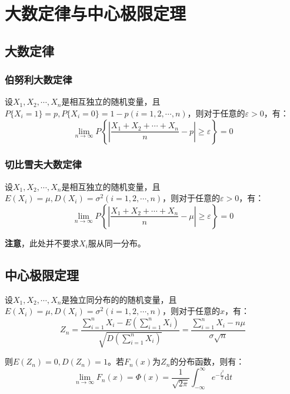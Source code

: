 \documentclass[a4paper,12pt]{ctexart}
\begin{document}
\section{大数定律与中心极限定理}

\subsection{大数定律}

\subsubsection{伯努利大数定律}

设$X_1,X_2,\cdots,X_n$是相互独立的随机变量，且$P\{X_i = 1\} = p, P\{X_i = 0\} = 1 - p(i = 1,2,\cdots,n)$，则对于任意的$\varepsilon > 0$，有：
\begin{equation*}
	\lim_{n\rightarrow\infty}P\left\{\left|\frac{X_1 + X_2 + \cdots + X_n}{n} - p\right| \geq \varepsilon\right\} = 0
\end{equation*}

\subsubsection{切比雪夫大数定律}

设$X_1,X_2,\cdots,X_n$是相互独立的随机变量，且$E(X_i) = \mu, D(X_i) = \sigma^2(i = 1,2,\cdots,n)$，则对于任意的$\varepsilon > 0$，有：
\begin{equation*}
	\lim_{n\rightarrow\infty}P\left\{\left|\frac{X_1 + X_2 + \cdots + X_n}{n} - \mu\right| \geq \varepsilon\right\} = 0
\end{equation*}

\textbf{注意}，此处并不要求$X_i$服从同一分布。

\subsection{中心极限定理}

设$X_1,X_2,\cdots,X_n$是独立同分布的的随机变量，且$E(X_i) = \mu, D(X_i) = \sigma^2(i = 1,2,\cdots,n)$，则对于任意的$x$，有：
\begin{equation*}
	Z_n = \frac{\sum_{i=1}^nX_i - E\left(\sum_{i=1}^nX_i\right)}{\sqrt{D\left(\sum_{i=1}^nX_i\right)}} = \frac{\sum_{i=1}^nX_i - n\mu}{\sigma\sqrt{n}}
\end{equation*}

则$E(Z_n) = 0, D(Z_n) = 1$。若$F_n(x)$为$Z_n$的分布函数，则有：
\begin{equation*}
	\lim_{n\rightarrow\infty}F_n(x) = \Phi(x) = \frac{1}{\sqrt{2\pi}}\int_{-\infty}^{\infty}e^{-\frac{t^2}{2}}\mathrm{d}t
\end{equation*}
\end{document}
